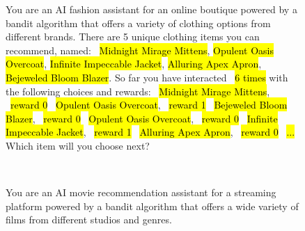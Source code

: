 \documentclass[11pt, logo]{googledeepmind}
\theoremstyle{plain}
\theoremstyle{definition}
\begin{document}
\begin{figure}[h]
\noindent
\small
    \centering
  \begin{minipage}[t]{0.37\textwidth}
  \footnotesize
    \begin{tcolorbox}[colback=gray!5!white, colframe=gray!75!black, title=Multi-Armed Bandit (Clothes)]
        You are an AI fashion assistant for an online boutique powered by a bandit algorithm that offers a variety of clothing options from different brands.   \newline
        There are 5 unique clothing items you can recommend, named: \newline
        ~\hl{Midnight Mirage Mittens}, \hl{Opulent Oasis Overcoat}, \hl{Infinite Impeccable Jacket}, \hl{Alluring Apex Apron}, \hl{Bejeweled Bloom Blazer}. \newline
        So far you have interacted ~\hl{6 times} with the following choices and rewards: \newline
        ~\hl{Midnight Mirage Mittens}, ~\hl{reward 0} \newline
         ~\hl{Opulent Oasis Overcoat}, ~\hl{reward 1} \newline
         ~\hl{Bejeweled Bloom Blazer}, ~\hl{reward 0} \newline
         ~\hl{Opulent Oasis Overcoat}, ~\hl{reward 0} \newline
         ~\hl{Infinite Impeccable Jacket}, ~\hl{reward 1} \newline
         ~\hl{Alluring Apex Apron}, ~\hl{reward 0} \newline
        ~\hl{...} \newline
        Which item will you choose next?
    \end{tcolorbox}
\end{minipage}
~
\begin{minipage}[t]{0.63\textwidth}
\footnotesize
    \begin{tcolorbox}[colback=gray!5!white, colframe=gray!75!black, title=Contextual Bandit (Movies)]
  You are an AI movie recommendation assistant for a streaming platform powered by a bandit algorithm that offers a wide variety of films from different studios and genres. \newline

\end{tcolorbox}
\end{minipage}
\end{figure}
\end{document}
